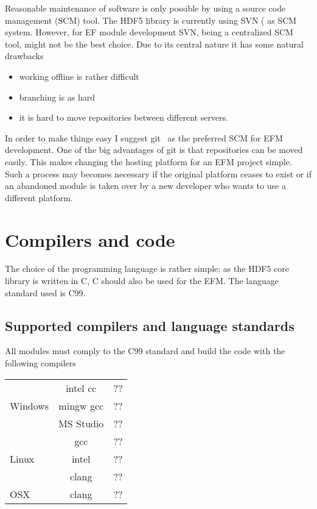 \documentclass{scrartcl}
\begin{document}
Reasonable maintenance of software is only possible by using a source code
management (SCM) tool. The HDF5 library is currently using SVN\cite{SVN}
( as SCM system. However, for EF module
development SVN, being a centralized SCM tool, might not be the best choice. 
Due to its central nature it has some natural drawbacks
\begin{itemize}
    \item working offline is rather difficult 
    \item branching is as hard 
    \item it is hard to move repositories between different servers. 
\end{itemize}
In order to make things easy I suggest git~\cite{GIT} as the preferred SCM for EFM 
development. One of the big advantages of git is that repositories can be 
moved easily. This makes changing the hosting platform for an EFM project
simple. Such a process may becomes necessary if the original platform ceases 
to exist or if an abandoned module is taken over by a new developer who 
wants to use a different platform. 


\section{Compilers and code}

The choice of the programming language is rather simple: as the HDF5 core
library is written in C, C should also be used for the EFM. 
The language standard used is C99.

\subsection{Supported compilers and language standards}

All modules must comply to the C99 standard and build the code with the
following compilers 
\begin{center}
\begin{tabular}{l|| c | c}
    \hline
    \multirow{3}{*}{Windows} & intel cc & ?? \\
                             & mingw gcc  & ?? \\
     & MS Studio & ?? \\
    \hline
    \multirow{3}{*}{Linux} & gcc & ?? \\
     & intel & ??  \\
     & clang & ?? \\
    \hline
    OSX     & clang & ?? \\
    \hline
\end{tabular}
\end{center}
\end{document}
